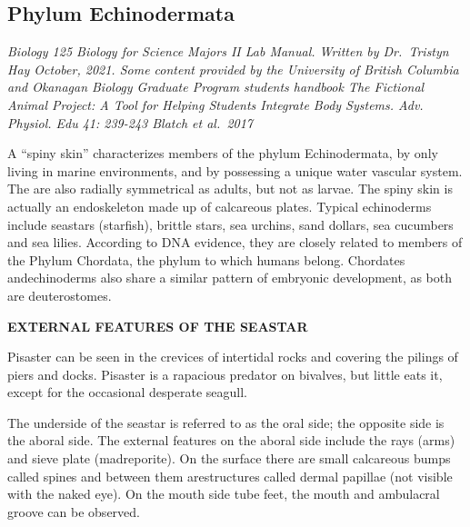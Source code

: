 \documentclass[
]{book}
\begin{document}
\hypertarget{phylum-echinodermata}{%
\subsection*{Phylum Echinodermata}\label{phylum-echinodermata}}

\emph{Biology 125 Biology for Science Majors II Lab Manual. Written by Dr.~Tristyn Hay October, 2021. Some content provided by the University of British Columbia and Okanagan Biology Graduate Program students handbook The Fictional Animal Project: A Tool for Helping Students Integrate Body Systems. Adv. Physiol. Edu 41: 239-243 Blatch et al.~2017}

A ``spiny skin'' characterizes members of the phylum Echinodermata, by only living in marine environments, and by possessing a unique water vascular system. The are also radially symmetrical as adults, but not as larvae. The spiny skin is actually an endoskeleton made up of calcareous plates. Typical echinoderms include seastars (starfish), brittle stars, sea urchins, sand dollars, sea cucumbers and sea lilies. According to DNA evidence, they are closely related to members of the Phylum Chordata, the phylum to which humans belong. Chordates andechinoderms also share a similar pattern of embryonic development, as both are deuterostomes.

\textbf{EXTERNAL FEATURES OF THE SEASTAR}

Pisaster can be seen in the crevices of intertidal rocks and covering the pilings of piers and docks. Pisaster is a rapacious predator on bivalves, but little eats it, except for the occasional desperate seagull.

The underside of the seastar is referred to as the oral side; the opposite side is the aboral side. The external features on the aboral side include the rays (arms) and sieve plate (madreporite). On the surface there are small calcareous bumps called spines and between them arestructures called dermal papillae (not visible with the naked eye). On the mouth side tube feet, the mouth and ambulacral groove can be observed.
\end{document}
